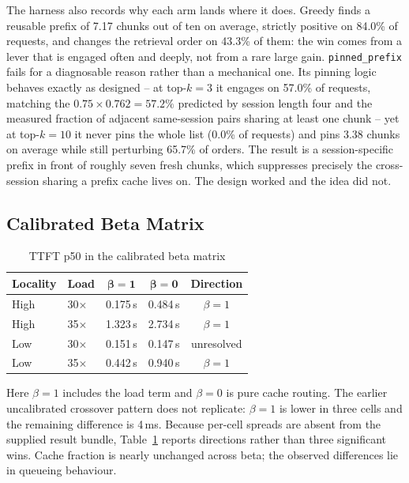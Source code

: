 \documentclass[conference]{IEEEtran}
\begin{document}
The harness also records why each arm lands where it does. Greedy finds a
reusable prefix of 7.17 chunks out of ten on average, strictly positive on
84.0\% of requests, and changes the retrieval order on 43.3\% of them: the
win comes from a lever that is engaged often and deeply, not from a rare
large gain. \texttt{pinned\_prefix} fails for a diagnosable reason rather
than a mechanical one. Its pinning logic behaves exactly as designed --
at top-$k{=}3$ it engages on 57.0\% of requests, matching the
$0.75\times0.762=57.2\%$ predicted by session length four and the measured
fraction of adjacent same-session pairs sharing at least one chunk -- yet
at top-$k{=}10$ it never pins the whole list (0.0\% of requests) and pins
3.38 chunks on average while still perturbing 65.7\% of orders. The result
is a session-specific prefix in front of roughly seven fresh chunks, which
suppresses precisely the cross-session sharing a prefix cache lives on.
The design worked and the idea did not.

\subsection{Calibrated Beta Matrix}

\begin{table}[t]
\caption{TTFT p50 in the calibrated beta matrix}
\label{tab:beta}
\centering
\footnotesize
\begin{tabular}{@{}llccc@{}}
\toprule
\textbf{Locality} & \textbf{Load} & $\boldsymbol{\beta=1}$ & $\boldsymbol{\beta=0}$ & \textbf{Direction} \\
\midrule
High & 30$\times$ & 0.175\,s & 0.484\,s & $\beta{=}1$ \\
High & 35$\times$ & 1.323\,s & 2.734\,s & $\beta{=}1$ \\
Low & 30$\times$ & 0.151\,s & 0.147\,s & unresolved \\
Low & 35$\times$ & 0.442\,s & 0.940\,s & $\beta{=}1$ \\
\bottomrule
\end{tabular}
\end{table}

Here $\beta{=}1$ includes the load term and $\beta{=}0$ is pure cache
routing. The earlier uncalibrated crossover pattern does not replicate:
$\beta{=}1$ is lower in three cells and the remaining difference is
4\,ms. Because per-cell spreads are absent from the supplied result
bundle, Table~\ref{tab:beta} reports directions rather than three
significant wins. Cache fraction is nearly unchanged across beta; the
observed differences lie in queueing behaviour.
\end{document}
